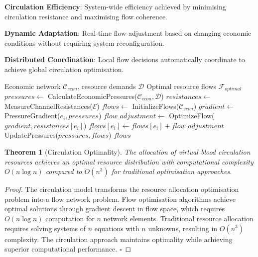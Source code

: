 \documentclass[12pt,a4paper]{article}
\newtheorem{theorem}{Theorem}
\begin{document}
\textbf{Circulation Efficiency}: System-wide efficiency achieved by minimising circulation resistance and maximising flow coherence.

\textbf{Dynamic Adaptation}: Real-time flow adjustment based on changing economic conditions without requiring system reconfiguration.

\textbf{Distributed Coordination}: Local flow decisions automatically coordinate to achieve global circulation optimisation.

\begin{algorithm}
\caption{Virtual Blood Circulation Resource Allocation}
\begin{algorithmic}[1]
\Require Economic network $\mathcal{C}_{econ}$, resource demands $\mathcal{D}$
\Ensure Optimal resource flows $\mathcal{F}_{optimal}$
\State $pressures \leftarrow$ CalculateEconomicPressures($\mathcal{C}_{econ}, \mathcal{D}$)
\State $resistances \leftarrow$ MeasureChannelResistances($\mathcal{E}$)
\State $flows \leftarrow$ InitializeFlows($\mathcal{C}_{econ}$)
        \State $gradient \leftarrow$ PressureGradient($e_i, pressures$)
        \State $flow\_adjustment \leftarrow$ OptimizeFlow($gradient, resistances[e_i]$)
        \State $flows[e_i] \leftarrow flows[e_i] + flow\_adjustment$
    \EndFor
    \State UpdatePressures($pressures, flows$)
\EndWhile
\Return $flows$
\end{algorithmic}
\end{algorithm}

\begin{theorem}[Circulation Optimality]
The allocation of virtual blood circulation resources achieves an optimal resource distribution with computational complexity $O(n \log n)$ compared to $O(n^3)$ for traditional optimisation approaches.
\end{theorem}

\begin{proof}
The circulation model transforms the resource allocation optimisation problem into a flow network problem. Flow optimisation algorithms achieve optimal solutions through gradient descent in flow space, which requires $O(n \log n)$ computation for $n$ network elements. Traditional resource allocation requires solving systems of $n$ equations with $n$ unknowns, resulting in $O(n^3)$ complexity. The circulation approach maintains optimality while achieving superior computational performance. $\square$
\end{proof}
\end{document}
